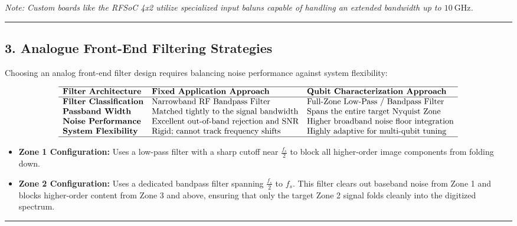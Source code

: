 \documentclass[
]{article}
\providecommand{\tightlist}{%
  \setlength{\itemsep}{0pt}\setlength{\parskip}{0pt}}
\begin{document}
\emph{Note: Custom boards like the RFSoC 4x2 utilize specialized input
baluns capable of handling an extended bandwidth up to
\(10\ \text{GHz}\).}

\begin{center}\rule{0.5\linewidth}{0.5pt}\end{center}

\subsection{3. Analogue Front-End Filtering
Strategies}\label{analogue-front-end-filtering-strategies}

Choosing an analog front-end filter design requires balancing noise
performance against system flexibility:

\[\begin{array}{lll}
\hline
\textbf{Filter Architecture} & \textbf{Fixed Application Approach} & \textbf{Qubit Characterization Approach} \\ \hline
\textbf{Filter Classification} & \text{Narrowband RF Bandpass Filter} & \text{Full-Zone Low-Pass / Bandpass Filter} \\
\textbf{Passband Width} & \text{Matched tightly to the signal bandwidth} & \text{Spans the entire target Nyquist Zone} \\
\textbf{Noise Performance} & \text{Excellent out-of-band rejection and SNR} & \text{Higher broadband noise floor integration} \\
\textbf{System Flexibility} & \text{Rigid; cannot track frequency shifts} & \text{Highly adaptive for multi-qubit tuning} \\ \hline
\end{array}\]

\begin{itemize}
\tightlist
\item
  \textbf{Zone 1 Configuration:} Uses a low-pass filter with a sharp
  cutoff near \(\frac{f_s}{2}\) to block all higher-order image
  components from folding down.
\item
  \textbf{Zone 2 Configuration:} Uses a dedicated bandpass filter
  spanning \(\frac{f_s}{2}\) to \(f_s\). This filter clears out baseband
  noise from Zone 1 and blocks higher-order content from Zone 3 and
  above, ensuring that only the target Zone 2 signal folds cleanly into
  the digitized spectrum.
\end{itemize}

\begin{center}\rule{0.5\linewidth}{0.5pt}\end{center}
\end{document}
